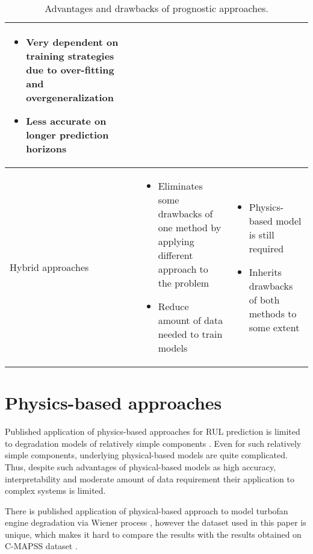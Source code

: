 \begin{table}[h!]
{\begin{tabular}{ m{3cm}  m{6cm}  m{6cm} }
\begin{itemize}
            \item Very dependent on training strategies due to over-fitting and overgeneralization
            \item Less accurate on longer prediction horizons 
        \end{itemize}\\
        \hline
        Hybrid \mbox{approaches} & 
        \begin{itemize} 
            \item Eliminates some drawbacks of one method by applying different approach to the problem
            \item Reduce amount of data needed to train models 
        \end{itemize} & 
        \begin{itemize} 
            \item Physics-based model is still required 
            \item Inherits drawbacks of both methods to some extent
        \end{itemize}\\
        \hline
    \end{tabular}}
\caption{Advantages and drawbacks of prognostic approaches.}
\label{table:methods properties}
\end{table}




\section{Physics-based approaches}
Published application of physics-based approaches for RUL prediction is limited to degradation models of relatively simple components \cite{Bolander2009, LUI2021229327, Daigle2014, Daigle2013}. Even for such relatively simple components, underlying physical-based models are quite complicated. Thus, despite such advantages of physical-based models as high accuracy, interpretability and moderate amount of data requirement their application to complex systems is limited.   

There is published application of physical-based approach to model turbofan engine degradation via Wiener process \cite{Liu8186519}, however the dataset used in this paper is unique, which makes it hard to compare the results with the results obtained on C-MAPSS dataset \cite{Saxena2008}.
